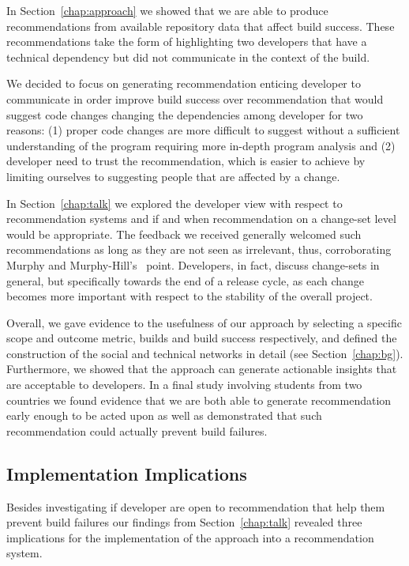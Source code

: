 In Section~\ref{chap:approach} we showed that we are able to produce recommendations from available repository data that affect build success.
These recommendations take the form of highlighting two developers that have a technical dependency but did not communicate in the context of the build.

We decided to focus on generating recommendation enticing developer to communicate in order improve build success over recommendation that would suggest code changes changing the dependencies among developer for two reasons:
(1) proper code changes are more difficult to suggest without a sufficient understanding of the program requiring more in-depth program analysis and 
(2) developer need to trust the recommendation, which is easier to achieve by limiting ourselves to suggesting people that are affected by a change.

In Section~\ref{chap:talk} we explored the developer view with respect to recommendation systems and if and when recommendation on a change-set level would be appropriate.
The feedback we received generally welcomed such recommendations as long as they are not seen as irrelevant, thus, corroborating Murphy and Murphy-Hill's~\cite{murphy:rsse:2010} point.
Developers, in fact, discuss change-sets in general, but specifically towards the end of a release cycle, as each change becomes more important with respect to the stability of the overall project.

Overall, we gave evidence to the usefulness of our approach by selecting a specific scope and outcome metric, builds and build success respectively, and defined the construction of the social and technical networks in detail (see Section~\ref{chap:bg}).
Furthermore, we showed that the approach can generate actionable insights that are acceptable to developers.
In a final study involving students from two countries we found evidence that we are both able to generate recommendation early enough to be acted upon as well as demonstrated that such recommendation could actually prevent build failures.



\subsection{Implementation Implications}
Besides investigating if developer are open to recommendation that help them prevent build failures our findings from Section~\ref{chap:talk} revealed three implications for the implementation of the approach into a recommendation system.

